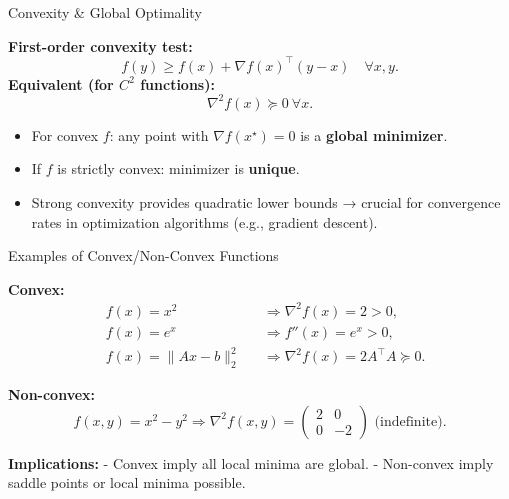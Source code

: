 \documentclass[aspectratio=169]{beamer}
\begin{document}
\begin{frame}{Convexity \& Global Optimality}

\textbf{First-order convexity test:}
\[
f(y)\ge f(x)+\nabla f(x)^\top(y-x)
\quad \forall x,y.
\]
\textbf{Equivalent (for \(C^2\) functions):}
\[
\nabla^2 f(x)\succeq 0 \ \forall x.
\]

\begin{itemize}
  \item For convex \(f\): any point with \(\nabla f(x^\star)=0\) is a \textbf{global minimizer}.
  \item If \(f\) is strictly convex: minimizer is \textbf{unique}.
  \item Strong convexity provides quadratic lower bounds → crucial for convergence rates in optimization algorithms (e.g., gradient descent).
\end{itemize}

\end{frame}

\begin{frame}{Examples of Convex/Non-Convex Functions}

\textbf{Convex:}
\[
\begin{aligned}
&f(x)=x^2 &&\Rightarrow \nabla^2 f(x)=2>0,\\
&f(x)=e^x &&\Rightarrow f''(x)=e^x>0,\\
&f(x)=\|Ax-b\|_2^2 &&\Rightarrow \nabla^2 f(x)=2A^\top A\succeq 0.
\end{aligned}
\]

\textbf{Non-convex:}
\[
f(x,y)=x^2-y^2
\Rightarrow 
\nabla^2 f(x,y)=
\begin{pmatrix}
2 & 0\\[2pt]
0 & -2
\end{pmatrix}
\text{ (indefinite)}.
\]

\textbf{Implications:}
- Convex imply all local minima are global.  
- Non-convex imply saddle points or local minima possible.

\end{frame}
\end{document}
